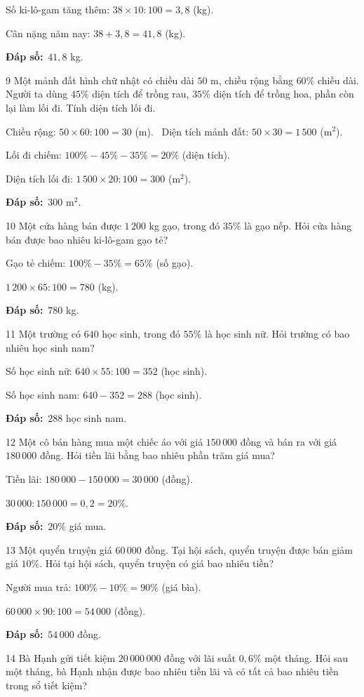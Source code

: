 \documentclass[11pt]{article}
\newif\ifsol \solfalse
\providecommand{\AnsWord}{Đáp số}
\newcommand{\dapso}[1]{\par\textbf{\AnsWord:}\ #1}
\newcommand{\probsol}[1]{%
  \begin{lrbox}{\solmeasure}\begin{minipage}{\dimexpr\linewidth-24pt\relax}#1\end{minipage}\end{lrbox}%
  \ifsol
    \begin{solbox}#1\end{solbox}%
  \else
    \setlength{\solht}{\dimexpr\ht\solmeasure+\dp\solmeasure+0.85cm\relax}%
    \ifdim\solht<1.35cm\setlength{\solht}{1.35cm}\fi
    \begin{tcolorbox}[colback=white,colframe=Line,boxrule=0.8pt,arc=5pt,
      left=8pt,right=8pt,top=4pt,bottom=4pt,height=\solht]{\footnotesize\color{Slate}\itshape\WorkWord}\end{tcolorbox}%
  \fi}
\newcommand{\gap}{\vspace{0.3cm}}
\def\WorkWord{Bài làm:}
\def\AnsWord{Đáp số}
\begin{document}
\probsol{
Số ki-lô-gam tăng thêm: $38\times10:100=3{,}8$ (kg).\par
Cân nặng năm nay: $38+3{,}8=41{,}8$ (kg).
\dapso{$41{,}8$ kg.}}
\gap
\begin{probbox}{9}{\relax}
Một mảnh đất hình chữ nhật có chiều dài $50$ m, chiều rộng bằng $60\%$ chiều dài. Người ta dùng $45\%$ diện tích để trồng rau, $35\%$ diện tích để trồng hoa, phần còn lại làm lối đi. Tính diện tích lối đi.
\end{probbox}
\probsol{
Chiều rộng: $50\times60:100=30$ (m). \ Diện tích mảnh đất: $50\times30=1\,500$ (m$^2$).\par
Lối đi chiếm: $100\%-45\%-35\%=20\%$ (diện tích).\par
Diện tích lối đi: $1\,500\times20:100=300$ (m$^2$).
\dapso{$300$ m$^2$.}}
\gap
\begin{probbox}{10}{\relax}
Một cửa hàng bán được $1\,200$ kg gạo, trong đó $35\%$ là gạo nếp. Hỏi cửa hàng bán được bao nhiêu ki-lô-gam gạo tẻ?
\end{probbox}
\probsol{
Gạo tẻ chiếm: $100\%-35\%=65\%$ (số gạo).\par
$1\,200\times65:100=780$ (kg).
\dapso{$780$ kg.}}
\gap
\begin{probbox}{11}{\relax}
Một trường có $640$ học sinh, trong đó $55\%$ là học sinh nữ. Hỏi trường có bao nhiêu học sinh nam?
\end{probbox}
\probsol{
Số học sinh nữ: $640\times55:100=352$ (học sinh).\par
Số học sinh nam: $640-352=288$ (học sinh).
\dapso{$288$ học sinh nam.}}
\gap
\begin{probbox}{12}{\relax}
Một cô bán hàng mua một chiếc áo với giá $150\,000$ đồng và bán ra với giá $180\,000$ đồng. Hỏi tiền lãi bằng bao nhiêu phần trăm giá mua?
\end{probbox}
\probsol{
Tiền lãi: $180\,000-150\,000=30\,000$ (đồng).\par
$30\,000:150\,000=0{,}2=20\%$.
\dapso{$20\%$ giá mua.}}
\gap
\begin{probbox}{13}{\relax}
Một quyển truyện giá $60\,000$ đồng. Tại hội sách, quyển truyện được bán giảm giá $10\%$. Hỏi tại hội sách, quyển truyện có giá bao nhiêu tiền?
\end{probbox}
\probsol{
Người mua trả: $100\%-10\%=90\%$ (giá bìa).\par
$60\,000\times90:100=54\,000$ (đồng).
\dapso{$54\,000$ đồng.}}
\gap
\begin{probbox}{14}{\relax}
Bà Hạnh gửi tiết kiệm $20\,000\,000$ đồng với lãi suất $0{,}6\%$ một tháng. Hỏi sau một tháng, bà Hạnh nhận được bao nhiêu tiền lãi và có tất cả bao nhiêu tiền trong sổ tiết kiệm?
\end{probbox}
\end{document}
